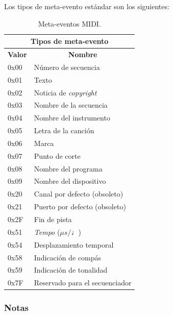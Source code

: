 \smallskip

Los tipos de meta-evento estándar son los siguientes:

\smallskip

\begin{table}[H]
	\begin{center}
		\begin{tabular}{|l|l|}
			\hline \multicolumn{2}{|c|}{\textbf{Tipos de meta-evento}} \\
			\hline \multicolumn{1}{|c|}{\textbf{Valor}} & \multicolumn{1}{c|}{\textbf{Nombre}} \\
			\hline 0x00 & Número de secuencia \\
			\hline 0x01 & Texto \\
			\hline 0x02 & Noticia de \textit{copyright} \\
			\hline 0x03 & Nombre de la secuencia \\
			\hline 0x04 & Nombre del instrumento \\
			\hline 0x05 & Letra de la canción \\
			\hline 0x06 & Marca \\
			\hline 0x07 & Punto de corte \\
			\hline 0x08 & Nombre del programa \\
			\hline 0x09 & Nombre del dispositivo \\
			\hline 0x20 & Canal por defecto (obsoleto) \\
			\hline 0x21 & Puerto por defecto (obsoleto) \\
			\hline 0x2F & Fin de pista \\
			\hline 0x51 & \textit{Tempo} ($\mu s/\quarternote$) \\
			\hline 0x54 & Desplazamiento temporal \\
			\hline 0x58 & Indicación de compás \\
			\hline 0x59 & Indicación de tonalidad \\
			\hline 0x7F & Reservado para el secuenciador \\
			\hline 
		\end{tabular}
		\smallskip
		\caption{\label{tab:midi_metaeventos} Meta-eventos MIDI.}
	\end{center}
\end{table}

\smallskip

\subsubsection{Notas}

